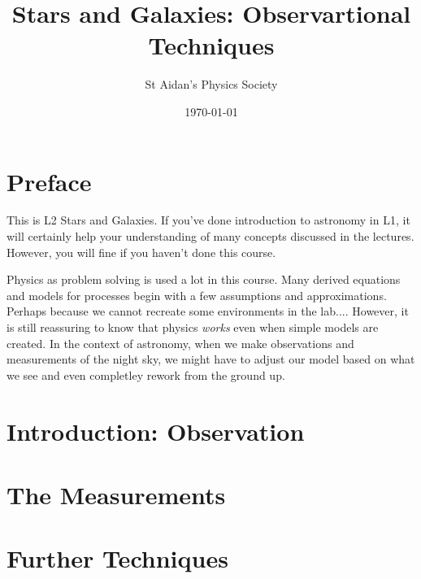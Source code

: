 \documentclass{physics_notes}
\title{Stars and Galaxies: Observartional Techniques}
\author{St Aidan's Physics Society}
\date{\today}
\begin{document}
\maketitle


\tableofcontents
\newpage

\section{Preface}
This is L2 Stars and Galaxies. If you've done introduction to astronomy in L1, it will certainly help your understanding of many concepts discussed in the lectures. However, you will fine if you haven't done this course. \par Physics as problem solving is used a lot in this course. Many derived equations and models for processes begin with a few assumptions and approximations. Perhaps because we cannot recreate some environments in the lab.... However, it is still reassuring to know that physics \textit{works} even when simple models are created. In the context of astronomy, when we make observations and measurements of the night sky, we might have to adjust our model based on what we see and even completley rework from the ground up.



\section{Introduction: Observation}



\section{The Measurements}



\section{Further Techniques}

\end{document}
